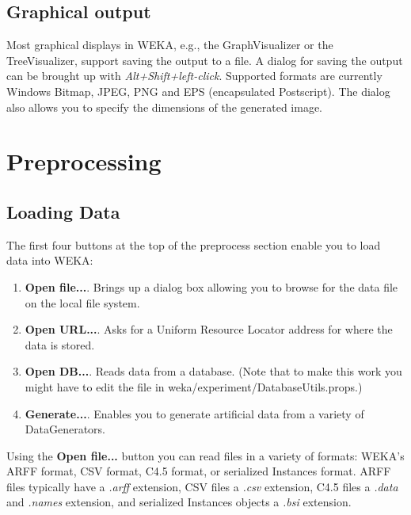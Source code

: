 \subsection{Graphical output}

Most graphical displays in WEKA, e.g., the GraphVisualizer or the
TreeVisualizer, support saving the output to a file. A dialog for saving 
the output can be brought up with \textit{Alt+Shift+left-click}. 
Supported formats are currently Windows Bitmap, JPEG, PNG and EPS 
(encapsulated Postscript). The dialog also allows you to specify the
dimensions of the generated image.

\newpage

\section{Preprocessing}

\begin{center}
\end{center}

\subsection{Loading Data}

The first four buttons at the top of the preprocess section enable
you to load data into WEKA:

\begin{enumerate}
\item \textbf{Open file...}.
Brings up a dialog box allowing you to browse for the data file on the local
file system.
\item \textbf{Open URL...}.
Asks for a Uniform Resource Locator address for where the data is stored.
\item \textbf{Open DB...}.  Reads data from a database. (Note that to
make this work you might have to edit the file in
weka/experiment/DatabaseUtils.props.)
\item \textbf{Generate...}.  Enables you to generate artificial data
from a variety of DataGenerators.
\end{enumerate}
\noindent
Using the \textbf{Open file...} button you can read files in a variety
of formats: WEKA's ARFF format, CSV format, C4.5 format, or serialized
Instances format. ARFF files typically have a {\em .arff\/}
extension, CSV files a {\em .csv\/} extension, C4.5 files a {\em
.data\/} and {\em .names\/} extension, and serialized Instances
objects a {\em .bsi\/} extension. 

